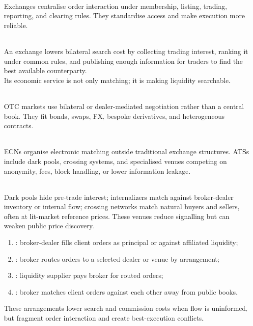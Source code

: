 \begin{definition} \\
Exchanges centralise order interaction under membership, listing, trading, reporting, and clearing rules. They standardise access and make execution more reliable.
\end{definition}

\begin{mechanism} \\
An exchange lowers bilateral search cost by collecting trading interest, ranking it under common rules, and publishing enough information for traders to find the best available counterparty.\\
Its economic service is not only matching; it is making liquidity searchable.
\end{mechanism}

\begin{definition} \\
OTC markets use bilateral or dealer-mediated negotiation rather than a central book. They fit bonds, swaps, FX, bespoke derivatives, and heterogeneous contracts.
\end{definition}

\begin{taxonomy} \\
ECNs organise electronic matching outside traditional exchange structures. ATSs include dark pools, crossing systems, and specialised venues competing on anonymity, fees, block handling, or lower information leakage.
\end{taxonomy}

\begin{taxonomy} \\
Dark pools hide pre-trade interest; internalizers match against broker-dealer inventory or internal flow; crossing networks match natural buyers and sellers, often at lit-market reference prices. These venues reduce signalling but can weaken public price discovery.
\end{taxonomy}

\begin{taxonomy} 
\begin{enumerate}[label=\roman*.]
\setlength{\itemsep}{0pt}
\item {}: broker-dealer fills client orders as principal or against affiliated liquidity;
\item {}: broker routes orders to a selected dealer or venue by arrangement;
\item {}: liquidity supplier pays broker for routed orders;
\item {}: broker matches client orders against each other away from public books.
\end{enumerate}
These arrangements lower search and commission costs when flow is uninformed, but fragment order interaction and create best-execution conflicts.
\end{taxonomy}


